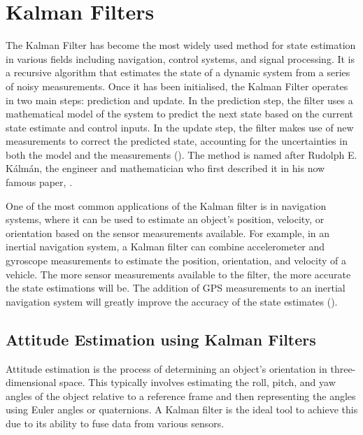 \section{Kalman Filters}
\label{sec:ch3:section5}

The Kalman Filter has become the most widely used method for state estimation in various fields including navigation, control systems, and signal processing. It is a recursive algorithm that estimates the state of a dynamic system from a series of noisy measurements. Once it has been initialised, the Kalman Filter operates in two main steps: prediction and update. In the prediction step, the filter uses a mathematical model of the system to predict the next state based on the current state estimate and control inputs. In the update step, the filter makes use of new measurements to correct the predicted state, accounting for the uncertainties in both the model and the measurements (\cite{welch1995introduction}). The method is named after Rudolph E. Kálmán, the engineer and mathematician who first described it in his now famous paper, \cite{kalmanNewApproachLinear1960}.

One of the most common applications of the Kalman filter is in navigation systems, where it can be used to estimate an object's position, velocity, or orientation based on the sensor measurements available. For example, in an inertial navigation system, a Kalman filter can combine accelerometer and gyroscope measurements to estimate the position, orientation, and velocity of a vehicle. The more sensor measurements available to the filter, the more accurate the state estimations will be. The addition of \ac{GPS} measurements to an inertial navigation system will greatly improve the accuracy of the state estimates (\cite{grewalApplicationsKalmanFiltering2010}).

\subsection{Attitude Estimation using Kalman Filters}
\label{subsec:ch3.section5.subsec1}

Attitude estimation is the process of determining an object's orientation in three-dimensional space. This typically involves estimating the roll, pitch, and yaw angles of the object relative to a reference frame and then representing the angles using Euler angles or quaternions. A Kalman filter is the ideal tool to achieve this due to its ability to fuse data from various sensors.

